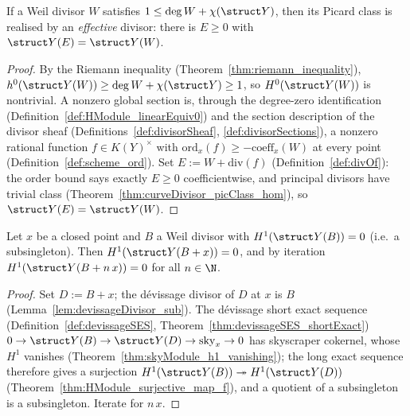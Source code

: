 \begin{lemma}
  \label{lem:exists_effective_of_picClass}
  \leanok
  If a Weil divisor \(W\) satisfies \(1 \le \deg W + \chi(\struct Y)\), then its Picard
  class is realised by an \emph{effective} divisor: there is \(E \ge 0\) with
  \(\struct Y(E) = \struct Y(W)\).
\end{lemma}
\begin{proof}
  \leanok
  By the Riemann inequality (Theorem~\ref{thm:riemann_inequality}),
  \(h^0(\struct Y(W)) \ge \deg W + \chi(\struct Y) \ge 1\), so \(H^0(\struct Y(W))\) is
  nontrivial. A nonzero global section is, through the degree-zero identification
  (Definition~\ref{def:HModule_linearEquiv0}) and the section description of the divisor
  sheaf (Definitions~\ref{def:divisorSheaf}, \ref{def:divisorSections}), a nonzero rational
  function \(f \in K(Y)^{\times}\) with \(\mathrm{ord}_x(f) \ge -\mathrm{coeff}_x(W)\) at
  every point (Definition~\ref{def:scheme_ord}). Set \(E := W + \mathrm{div}(f)\)
  (Definition~\ref{def:divOf}): the order bound says exactly \(E \ge 0\) coefficientwise,
  and principal divisors have trivial class
  (Theorem~\ref{thm:curveDivisor_picClass_hom}), so \(\struct Y(E) = \struct Y(W)\).
\end{proof}

\begin{lemma}
  \label{lem:peel_single}
  \leanok
  Let \(x\) be a closed point and \(B\) a Weil divisor with
  \(H^1(\struct Y(B)) = 0\) (i.e.\ a subsingleton). Then
  \(H^1(\struct Y(B + x)) = 0\), and by iteration
  \(H^1(\struct Y(B + n\,x)) = 0\) for all \(n \in \N\).
\end{lemma}
\begin{proof}
  \leanok
  Set \(D := B + x\); the d\'evissage divisor of \(D\) at \(x\) is \(B\)
  (Lemma~\ref{lem:devissageDivisor_sub}). The d\'evissage short exact sequence
  (Definition~\ref{def:devissageSES}, Theorem~\ref{thm:devissageSES_shortExact})
  \(0 \to \struct Y(B) \to \struct Y(D) \to \mathrm{sky}_x \to 0\) has skyscraper cokernel,
  whose \(H^1\) vanishes (Theorem~\ref{thm:skyModule_h1_vanishing}); the long exact
  sequence therefore gives a surjection \(H^1(\struct Y(B)) \twoheadrightarrow
  H^1(\struct Y(D))\) (Theorem~\ref{thm:HModule_surjective_map_f}), and a quotient of a
  subsingleton is a subsingleton. Iterate for \(n\,x\).
\end{proof}

